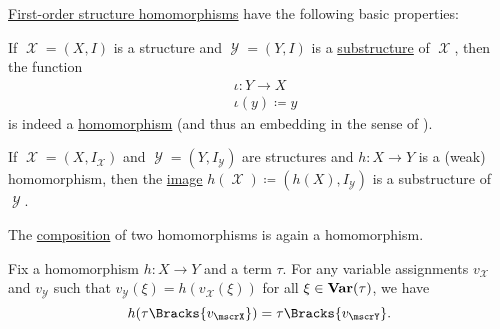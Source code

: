 \begin{proposition}\label{thm:first_order_homomorphism_properties}
  \hyperref[def:first_order_homomorphism]{First-order structure homomorphisms} have the following basic properties:
  \begin{thmenum}
     If \( \mscrX = (X, I) \) is a structure and \( \mscrY = (Y, I) \) is a \hyperref[def:first_order_substructure]{substructure} of \( \mscrX \), then the  function
    \begin{equation}\label{thm:first_order_homomorphism_properties/substructure/canonical_embedding}
      \begin{aligned}
        &\iota: Y \to X \\
        &\iota(y) \coloneqq y
      \end{aligned}
    \end{equation}
    is indeed a \hyperref[def:first_order_homomorphism_invertibility/projection]{homomorphism} (and thus an embedding in the sense of ).

     If \( \mscrX = (X, I_\mscrX) \) and \( \mscrY = (Y, I_\mscrY) \) are structures and \( h: X \to Y \) is a (weak) homomorphism, then the \hyperref[def:multi_valued_function/image]{image} \( h(\mscrX) \coloneqq (h(X), I_\mscrY) \) is a substructure of \( \mscrY \).

     The \hyperref[def:multi_valued_function/composition]{composition} of two homomorphisms is again a homomorphism.

     Fix a homomorphism \( h: X \to Y \) and a term \( \tau \). For any variable assignments \( v_\mscrX \) and \( v_\mscrY \) such that \( v_\mscrY(\xi) = h(v_\mscrX(\xi)) \) for all \( \xi \in \operatorname{\mathbf{Var}}(\tau) \), we have
    \begin{equation*}
      h(\tau\Bracks{v_\mscrX}) = \tau\Bracks{v_\mscrY}.
    \end{equation*}
  \end{thmenum}
\end{proposition}
